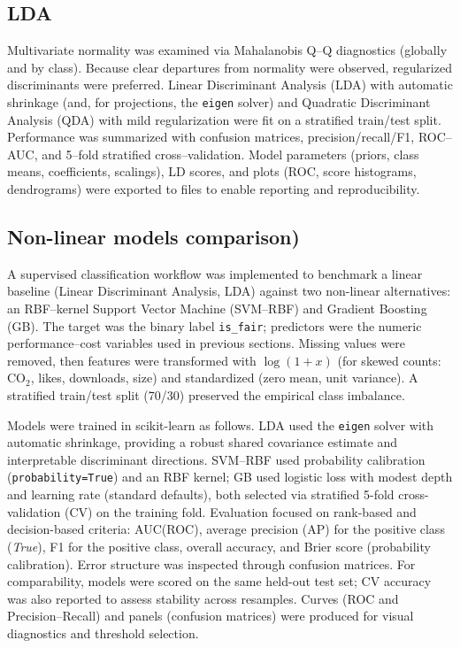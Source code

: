 \documentclass[journal]{IEEEtran}
\begin{document}
\subsection{LDA }

Multivariate normality was examined via Mahalanobis Q–Q diagnostics (globally and by class). Because clear departures from normality were observed, regularized discriminants were preferred. Linear Discriminant Analysis (LDA) with automatic shrinkage (and, for projections, the \texttt{eigen} solver) and Quadratic Discriminant Analysis (QDA) with mild regularization were fit on a stratified train/test split. Performance was summarized with confusion matrices, precision/recall/F1, ROC–AUC, and 5–fold stratified cross–validation. Model parameters (priors, class means, coefficients, scalings), LD scores, and plots (ROC, score histograms, dendrograms) were exported to files to enable reporting and reproducibility.

\subsection{Non-linear models comparison)}
A supervised classification workflow was implemented to benchmark a linear baseline
(Linear Discriminant Analysis, LDA) against two non-linear alternatives:
an RBF–kernel Support Vector Machine (SVM–RBF) and Gradient Boosting (GB).
The target was the binary label \texttt{is\_fair}; predictors were the numeric
performance–cost variables used in previous sections. Missing values were removed,
then features were transformed with $\log(1+x)$ (for skewed counts: CO$_2$, likes,
downloads, size) and standardized (zero mean, unit variance). A stratified
train/test split (70/30) preserved the empirical class imbalance. 

Models were trained in scikit-learn as follows.
LDA used the \texttt{eigen} solver with automatic shrinkage, providing a robust
shared covariance estimate and interpretable discriminant directions. SVM–RBF used
probability calibration (\texttt{probability=True}) and an RBF kernel; GB used
logistic loss with modest depth and learning rate (standard defaults), both selected
via stratified 5-fold cross-validation (CV) on the training fold. Evaluation focused
on rank-based and decision-based criteria: AUC(ROC), average precision (AP) for the
positive class (\emph{True}), F1 for the positive class, overall accuracy, and
Brier score (probability calibration). Error structure was inspected through
confusion matrices. For comparability, models were scored on the same held-out test
set; CV accuracy was also reported to assess stability across resamples. Curves
(ROC and Precision–Recall) and panels (confusion matrices) were produced for visual
diagnostics and threshold selection.
\end{document}
